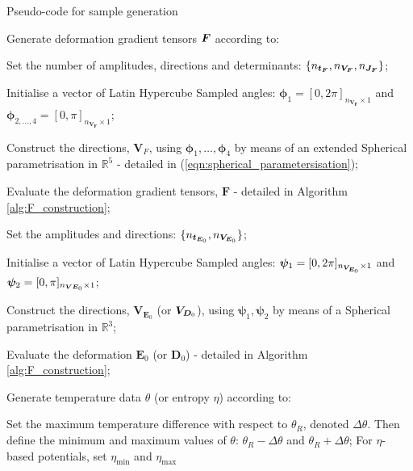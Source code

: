 \begin{algorithm}
	\caption{Pseudo-code for sample generation}
	\label{alg:sample_generation}
	
	\begin{algorithmic}[1]
		\State Generate deformation gradient tensors $\boldsymbol{F}$ according to:
		
		\begin{algorithmic}[1]
			\State Set the number of amplitudes, directions and determinants: $\{ n_{\bm{t}_{\boldsymbol{F}}}, n_{\bm{V}_{\boldsymbol{F}}}, n_{\bm{J}_{\boldsymbol{F}}}\}$;
			
			\State Initialise a vector of Latin Hypercube Sampled angles: $\bm{\phi}_1 = [0,2\pi]_{n_{\bm{V_F}} \times 1}$ and  $\bm{\phi}_{2,...,4} = [0,\pi]_{n_{\bm{V_F}} \times 1}$;
			
			\State Construct the directions, $\bm{V}_{F}$, using $\bm{\phi}_1, \dots, \bm{\phi}_4$ by means of an extended Spherical parametrisation in $\mathbb{R}^5$ - detailed in (\ref{eqn:spherical_parametersisation});
			
			\State Evaluate the deformation gradient tensors, $\bm{{F}}$ - detailed in Algorithm \ref{alg:F_construction};
		\end{algorithmic}
		
		
		\begin{algorithmic}[1]
			\State Set the amplitudes and directions: $\{n_{\bm{t}_{\boldsymbol{E}_0}},  n_{\bm{V}_{\boldsymbol{E}_0}}\}$;
			
			\State Initialise a vector of Latin Hypercube Sampled angles: $\bm{\psi}_1 = [0,2\pi]_{n_{\bm{V}_{\boldsymbol{E}_0}} \times 1}$ and  $\bm{\psi}_{2} = [0,\pi]_{n_{\bm{V}{\boldsymbol{E}_0}} \times 1}$;
			
			\State Construct the directions, $\bm{V}_{\bm{E}_0}$ (or $\boldsymbol{V}_{\boldsymbol{D}_0}$), using $\bm{\psi}_1, \bm{\psi}_2$ by means of a Spherical parametrisation in $\mathbb{R}^3$;
			
			\State Evaluate the deformation $\bm{{E}}_0$ (or $\bm{{D}}_0$) - detailed in Algorithm \ref{alg:F_construction};
		\end{algorithmic}
		
		\State Generate temperature data $\theta$ (or entropy $\eta$) according to:
		
		\begin{algorithmic}[1]
			\State Set the maximum temperature difference with respect to $\theta_R$, denoted $\Delta\theta$. Then define the minimum and maximum values of $\theta$: $\theta_R-\Delta\theta$ and $\theta_R+\Delta\theta$; For $\eta$-based potentials, set $\eta_{\text{min}}$ and $\eta_{\text{max}}$
			

\end{algorithmic}
\end{algorithmic}
\end{algorithm}
